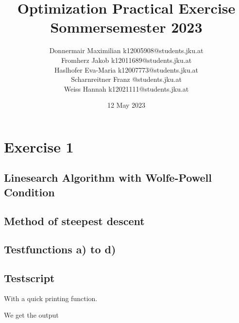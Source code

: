 \documentclass{article}
\title{Optimization Practical Exercise \\ Sommersemester 2023}
\author{Donnermair Maximilian k12005908@students.jku.at\\ Fromherz Jakob k12011689@students.jku.at\\Haslhofer Eva-Maria  k12007773@students.jku.at \\ Scharnreitner Franz @students.jku.at\\ Weiss Hannah k12021111@students.jku.at } %
\date{12 May 2023}
\begin{document}
	\maketitle
	
	\newpage
	
	\section{Exercise 1}
	
	\subsection{Linesearch Algorithm with Wolfe-Powell Condition}
	
	
	\subsection{Method of steepest descent}
	
	
	
	\subsection{Testfunctions a) to d)}
	
	
	
	
	
	
	
	
	\subsection{Testscript}
	
	
	With a quick printing function.
	
	
	We get the output
	
\end{document}
